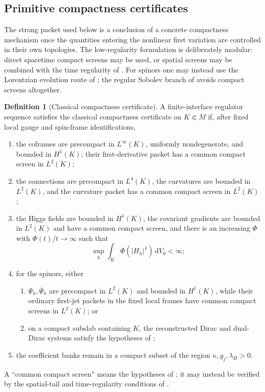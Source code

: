 \documentclass[11pt]{article}
\numberwithin{equation}{section}
\theoremstyle{definition}
\newtheorem{definition}[definition]{Definition}
\theoremstyle{remark}
\newcommand{\dd}{\mathrm d}
\newcommand{\abs}[1]{\lvert#1\rvert}
\newcommand{\bPsi}{\overline\Psi}
\newcommand{\dV}{\dd V}
\begin{document}
\subsection{Primitive compactness certificates}

The strong packet used below is a conclusion of a concrete compactness mechanism once the quantities entering the nonlinear first variation are controlled in their own topologies. The low-regularity formulation is deliberately modular: direct spacetime compact screens may be used, or spatial screens may be combined with the time regularity of . For spinors one may instead use the Lorentzian evolution route of ; the regular Sobolev branch of  avoids compact screens altogether.

\begin{definition}[Classical compactness certificate]
\label{def:compactness-certificate}
A finite-interface regulator sequence satisfies the classical compactness certificate on $K\Subset M$ if, after fixed local gauge and spin-frame identifications,
\begin{enumerate}[label=\textup{(C\arabic*)},leftmargin=3.2em]
\item the coframes are precompact in $L^\infty(K)$, uniformly nondegenerate, and bounded in $H^1(K)$; their first-derivative packet has a common compact screen in $L^2(K)$;
\item the connections are precompact in $L^4(K)$, the curvatures are bounded in $L^2(K)$, and the curvature packet has a common compact screen in $L^2(K)$;
\item the Higgs fields are bounded in $H^1(K)$, the covariant gradients are bounded in $L^2(K)$ and have a common compact screen, and there is an increasing $\Phi$ with $\Phi(t)/t\to\infty$ such that
\[
 \sup_h\int_K\Phi(\abs{H_h}^4)\,\dV_0<\infty;
\]
\item for the spinors, either
      \begin{enumerate}[label=\textup{(C4\alph*)},leftmargin=3.0em]
      \item $\Psi_h,\bPsi_h$ are precompact in $L^2(K)$ and bounded in $H^1(K)$, while their ordinary first-jet packets in the fixed local frames have common compact screens in $L^2(K)$; or
      \item on a compact subslab containing $K$, the reconstructed Dirac and dual-Dirac systems satisfy the hypotheses of ;
      \end{enumerate}
\item the coefficient banks remain in a compact subset of the region $\kappa,g_j,\lambda_H>0$.
\end{enumerate}
A ``common compact screen'' means the hypotheses of ; it may instead be verified by the spatial-tail and time-regularity conditions of .
\end{definition}
\end{document}
